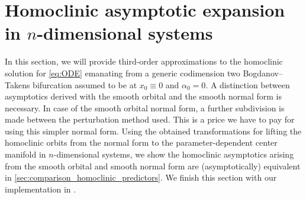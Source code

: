 \section{Homoclinic asymptotic expansion in \texorpdfstring{$n$}{n}-dimensional
systems}
\label{sec:homoclinic_asymptotics_n_dimension}
In this section, we will provide third-order approximations to the
homoclinic solution for \cref{eq:ODE} emanating from a generic codimension two
Bogdanov--Takens bifurcation assumed to be at $x_0 \equiv 0$ and $\alpha_0 = 0$.
A distinction between asymptotics derived with the smooth orbital and the smooth
normal form is necessary. In case of the smooth orbital normal form, a further
subdivision is made between the perturbation method used. This is a price we
have to pay for using this simpler normal form. Using the obtained
transformations for lifting the homoclinic orbits from the normal form to the
parameter-dependent center manifold in $n$-dimensional systems, we show the
homoclinic asymptotics arising from the smooth orbital and smooth normal form
are (asymptotically) equivalent in \cref{sec:comparison_homoclinic_predictors}.
We finish this section with our implementation in \MATCONT.


